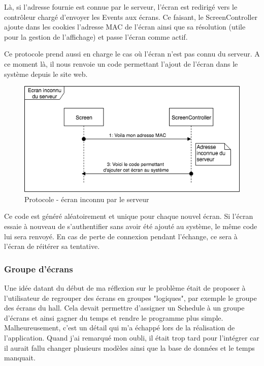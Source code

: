 \documentclass[french]{article}
\begin{document}
Là, si l'adresse fournie est connue par le serveur, l'écran est redirigé vers le contrôleur chargé d'envoyer les Events aux écrans. Ce faisant, le ScreenController ajoute dans les cookies l'adresse MAC de l'écran ainsi que sa résolution (utile pour la gestion de l'affichage) et passe l'écran comme actif.

Ce protocole prend aussi en charge le cas où l'écran n'est pas connu du serveur. A ce moment là, il nous renvoie un code permettant l'ajout de l'écran dans le système depuis le site web. 

	\begin{figure}[h]
		\centering	
		\includegraphics[scale=0.5]{schemas/screen_protocol_unknown.png}
		\caption{Protocole - écran inconnu par le serveur}
	\end{figure}
	
	Ce code est généré aléatoirement et unique pour chaque nouvel écran. Si l'écran essaie à nouveau de s'authentifier sans avoir été ajouté au système, le même code lui sera renvoyé. En cas de perte de connexion pendant l'échange, ce sera à l'écran de réitérer sa tentative. 
 
\subsubsection{Groupe d'écrans}
Une idée datant du début de ma réflexion sur le problème était de proposer à l'utilisateur de regrouper des écrans en groupes "logiques", par exemple le groupe des écrans du hall. Cela devait permettre d'assigner un Schedule à un groupe d'écrans et ainsi gagner du temps et rendre le programme plus simple. \newline
Malheureusement, c'est un détail qui m'a échappé lors de la réalisation de l'application. Quand j'ai remarqué mon oubli, il était trop tard pour l'intégrer car il aurait fallu changer plusieurs modèles ainsi que la base de données et le temps manquait.
\end{document}
